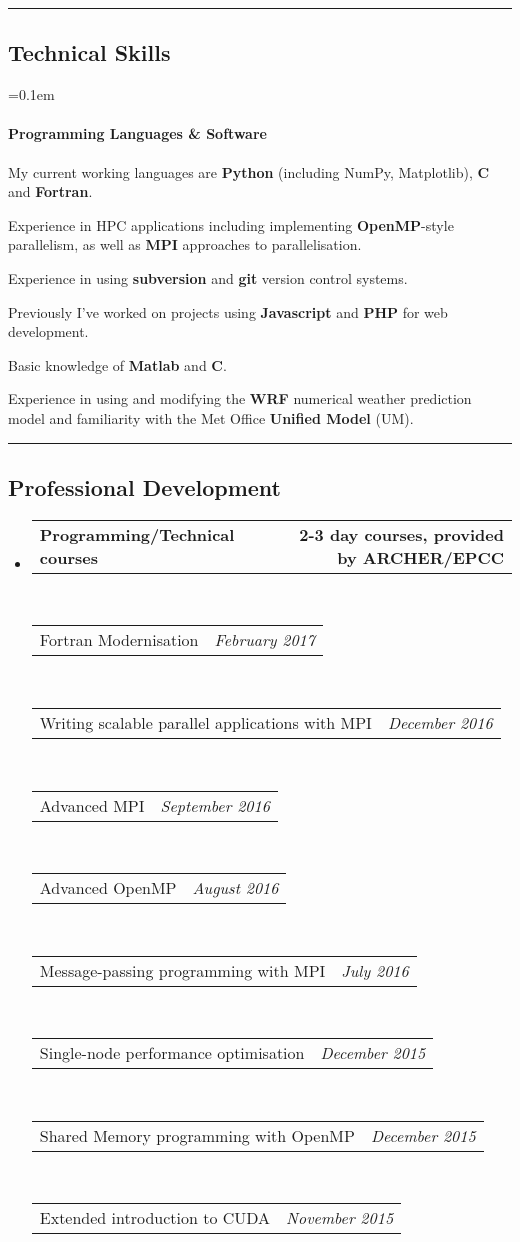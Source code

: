 \documentclass[10.5pt,a4]{article}
\makeatletter
\newcommand{\headerrow}[2]
{\begin{tabular*}{\linewidth}{l@{\extracolsep{\fill}}r}
	#1 &
	#2 \\
\end{tabular*}}
\newcommand{\CPP}
{C\nolinebreak[4]\hspace{-.05em}\raisebox{.22ex}{\footnotesize\bf ++}}
\makeatother
\begin{document}
\hrule
\vspace{-0.4em}
\subsection*{Technical Skills}
	\parskip=0.1em
	\paragraph*{Programming Languages \& Software}
		\begin{itemize*}
		\item My current working languages are \textbf{Python} (including NumPy, Matplotlib), {\textbf{\CPP}} and {\textbf{Fortran}}. 
		\item Experience in HPC applications including implementing \textbf{OpenMP}-style parallelism, as well as \textbf{MPI} approaches to parallelisation. 
		\item Experience in using \textbf{subversion} and \textbf{git} version control systems. 
		\item Previously I've worked on projects using \textbf{Javascript} and \textbf{PHP} for web development. 
		\item Basic knowledge of \textbf{Matlab} and \textbf{C}.
	\item Experience in using and modifying the \textbf{WRF} numerical weather prediction model and familiarity with the Met Office \textbf{Unified Model} (UM).
	\end{itemize*}


\hrule
\vspace{-0.4em}
\subsection*{Professional Development}
\begin{itemize}
	\item 
	\headerrow
		{\textbf{Programming/Technical courses}}
		{\textbf{2-3 day courses, provided by ARCHER/EPCC}}
	\\
		\headerrow
		{Fortran Modernisation}
		{\emph{February 2017}}
	\\
	\headerrow
		{Writing scalable parallel applications with MPI}
		{\emph{December 2016}}
	\\
	\headerrow
		{Advanced MPI}
		{\emph{September 2016}}
		\\
	\headerrow
		{Advanced OpenMP}
		{\emph{August 2016}}
	\\
	\headerrow
		{Message-passing programming with MPI}
		{\emph{July 2016}}
	\\
	\headerrow
		{Single-node performance optimisation}
		{\emph{December 2015}}
	\\
	\headerrow
		{Shared Memory programming with OpenMP}
		{\emph{December 2015}}
	\\
	\headerrow
		{Extended introduction to CUDA}
		{\emph{November 2015}}
\end{itemize}
\end{document}
